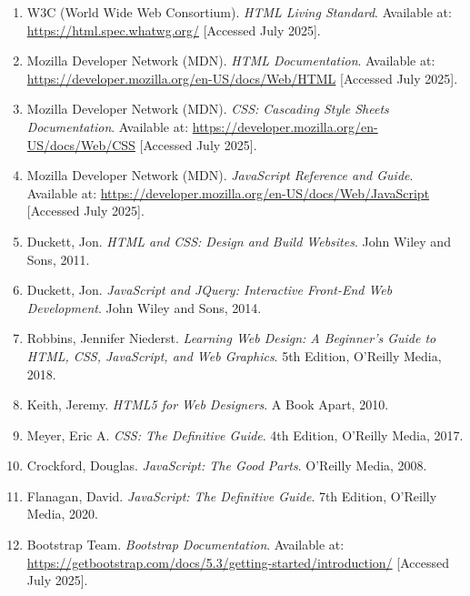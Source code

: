\documentclass[a4paper,12pt,oneside]{report}
\numberwithin{equation}{chapter}
\numberwithin{figure}{chapter}
\numberwithin{table}{chapter}
\begin{document}
\begin{enumerate}
    \item W3C (World Wide Web Consortium). \textit{HTML Living Standard}. Available at: \url{https://html.spec.whatwg.org/} [Accessed July 2025].

    \item Mozilla Developer Network (MDN). \textit{HTML Documentation}. Available at: \url{https://developer.mozilla.org/en-US/docs/Web/HTML} [Accessed July 2025].

    \item Mozilla Developer Network (MDN). \textit{CSS: Cascading Style Sheets Documentation}. Available at: \url{https://developer.mozilla.org/en-US/docs/Web/CSS} [Accessed July 2025].

    \item Mozilla Developer Network (MDN). \textit{JavaScript Reference and Guide}. Available at: \url{https://developer.mozilla.org/en-US/docs/Web/JavaScript} [Accessed July 2025].

    \item Duckett, Jon. \textit{HTML and CSS: Design and Build Websites}. John Wiley and Sons, 2011.

    \item Duckett, Jon. \textit{JavaScript and JQuery: Interactive Front-End Web Development}. John Wiley and Sons, 2014.

    \item Robbins, Jennifer Niederst. \textit{Learning Web Design: A Beginner’s Guide to HTML, CSS, JavaScript, and Web Graphics}. 5th Edition, O’Reilly Media, 2018.

    \item Keith, Jeremy. \textit{HTML5 for Web Designers}. A Book Apart, 2010.

    \item Meyer, Eric A. \textit{CSS: The Definitive Guide}. 4th Edition, O’Reilly Media, 2017.

    \item Crockford, Douglas. \textit{JavaScript: The Good Parts}. O’Reilly Media, 2008.

    \item Flanagan, David. \textit{JavaScript: The Definitive Guide}. 7th Edition, O’Reilly Media, 2020.

    \item Bootstrap Team. \textit{Bootstrap Documentation}. Available at: \url{https://getbootstrap.com/docs/5.3/getting-started/introduction/} [Accessed July 2025].


\end{enumerate}
\end{document}
